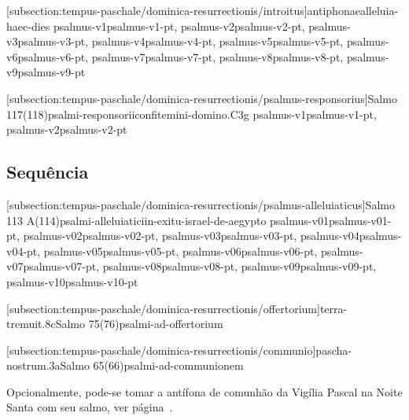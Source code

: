 \def\Prefix{subsection:tempus-paschale/dominica-resurrectionis}

[\Prefix/introitus]{}{antiphonae}{alleluia-haec-dies}{
  {psalmus-v1}{psalmus-v1-pt},
  {psalmus-v2}{psalmus-v2-pt},
  {psalmus-v3}{psalmus-v3-pt},
  {psalmus-v4}{psalmus-v4-pt},
  {psalmus-v5}{psalmus-v5-pt},
  {psalmus-v6}{psalmus-v6-pt},
  {psalmus-v7}{psalmus-v7-pt},
  {psalmus-v8}{psalmus-v8-pt},
  {psalmus-v9}{psalmus-v9-pt}
}

\AllowPageFlush

[\Prefix/psalmus-responsorius]{Salmo 117(118)}{psalmi-responsorii}{confitemini-domino.C3g}{
  {psalmus-v1}{psalmus-v1-pt},
  {psalmus-v2}{psalmus-v2-pt}
}

\AllowPageFlush

\subsection{Sequência}\label{\Prefix/sequentia}

\AllowPageFlush

[\Prefix/psalmus-alleluiaticus]{Salmo 113 A(114)}{psalmi-alleluiatici}{in-exitu-israel-de-aegypto}{
  {psalmus-v01}{psalmus-v01-pt},
  {psalmus-v02}{psalmus-v02-pt},
  {psalmus-v03}{psalmus-v03-pt},
  {psalmus-v04}{psalmus-v04-pt},
  {psalmus-v05}{psalmus-v05-pt},
  {psalmus-v06}{psalmus-v06-pt},
  {psalmus-v07}{psalmus-v07-pt},
  {psalmus-v08}{psalmus-v08-pt},
  {psalmus-v09}{psalmus-v09-pt},
  {psalmus-v10}{psalmus-v10-pt}
}

\AllowPageFlush

[\Prefix/offertorium]{terra-tremuit.8c}{Salmo 75(76)}{psalmi-ad-offertorium}

\AllowPageFlush

[\Prefix/communio]{pascha-nostrum.3a}{Salmo 65(66)}{psalmi-ad-communionem}

\begin{rubrica}
  Opcionalmente, pode-se tomar a antífona de comunhão da Vigília Pascal na Noite Santa com seu salmo, ver página~\pageref{subsection:hebdomada-sancta/ad-vigiliam-paschalem-in-nocte-sancta/communio}.
\end{rubrica}

